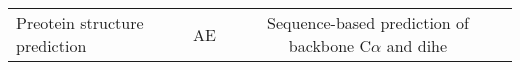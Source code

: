 \begin{center}
\begin{tabular}{l c c}
    Preotein structure prediction & AE & Sequence-based prediction of backbone C$\alpha$ and dihe 
\end{tabular}
\end{center}